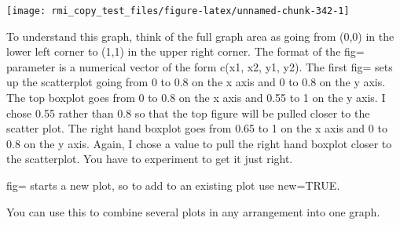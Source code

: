 \documentclass[]{book}
\newenvironment{Shaded}{\begin{snugshade}}{\end{snugshade}}
\newcommand{\DataTypeTok}[1]{\textcolor[rgb]{0.13,0.29,0.53}{#1}}
\newcommand{\DecValTok}[1]{\textcolor[rgb]{0.00,0.00,0.81}{#1}}
\newcommand{\FloatTok}[1]{\textcolor[rgb]{0.00,0.00,0.81}{#1}}
\newcommand{\KeywordTok}[1]{\textcolor[rgb]{0.13,0.29,0.53}{\textbf{#1}}}
\newcommand{\NormalTok}[1]{#1}
\newcommand{\OperatorTok}[1]{\textcolor[rgb]{0.81,0.36,0.00}{\textbf{#1}}}
\newcommand{\OtherTok}[1]{\textcolor[rgb]{0.56,0.35,0.01}{#1}}
\newcommand{\StringTok}[1]{\textcolor[rgb]{0.31,0.60,0.02}{#1}}
\theoremstyle{definition}
\theoremstyle{definition}
\theoremstyle{definition}
\theoremstyle{remark}
\begin{document}
\begin{Shaded}
\end{Shaded}

\begin{center}\texttt{[image: rmi\_copy\_test\_files/figure-latex/unnamed-chunk-342-1]} \end{center}

To understand this graph, think of the full graph area as going from
(0,0) in the lower left corner to (1,1) in the upper right corner. The
format of the fig= parameter is a numerical vector of the form c(x1, x2,
y1, y2). The first fig= sets up the scatterplot going from 0 to 0.8 on
the x axis and 0 to 0.8 on the y axis. The top boxplot goes from 0 to
0.8 on the x axis and 0.55 to 1 on the y axis. I chose 0.55 rather than
0.8 so that the top figure will be pulled closer to the scatter plot.
The right hand boxplot goes from 0.65 to 1 on the x axis and 0 to 0.8 on
the y axis. Again, I chose a value to pull the right hand boxplot closer
to the scatterplot. You have to experiment to get it just right.

fig= starts a new plot, so to add to an existing plot use new=TRUE.

You can use this to combine several plots in any arrangement into one
graph.
\end{document}
